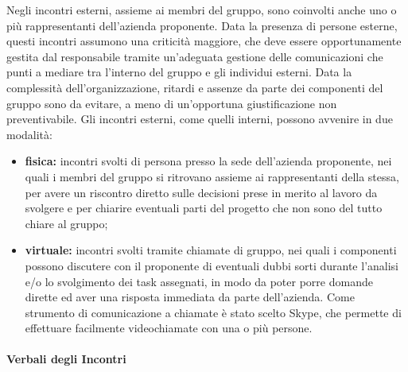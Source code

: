 				Negli incontri esterni, assieme ai membri del gruppo, sono coinvolti anche uno o più rappresentanti dell'azienda proponente.
				\newline
				Data la presenza di persone esterne, questi incontri assumono una criticità maggiore, che deve essere opportunamente gestita dal responsabile tramite un'adeguata gestione delle comunicazioni che punti a mediare tra l'interno del gruppo e gli individui esterni.
				\newline
				Data la complessità dell'organizzazione, ritardi e assenze da parte dei componenti del gruppo sono da evitare, a meno di un'opportuna giustificazione non preventivabile.\newline
				Gli incontri esterni, come quelli interni, possono avvenire in due modalità:
				\begin{itemize}
					\item \textbf{fisica:} incontri svolti di persona presso la sede dell'azienda proponente, nei quali i membri del gruppo si ritrovano assieme ai rappresentanti della stessa, per avere un riscontro diretto sulle decisioni prese in merito al lavoro da svolgere e per chiarire eventuali parti del progetto che non sono del tutto chiare al gruppo;
					\item \textbf{virtuale:} incontri svolti tramite chiamate di gruppo, nei quali i componenti possono discutere con il proponente di eventuali dubbi sorti durante l'analisi e/o lo svolgimento dei task assegnati, in modo da poter porre domande dirette ed aver una risposta immediata da parte dell'azienda.
					\newline
					Come strumento di comunicazione a chiamate è stato scelto Skype, che permette di effettuare facilmente videochiamate con una o più persone.
				\end{itemize}

			\paragraph{Verbali degli Incontri}

